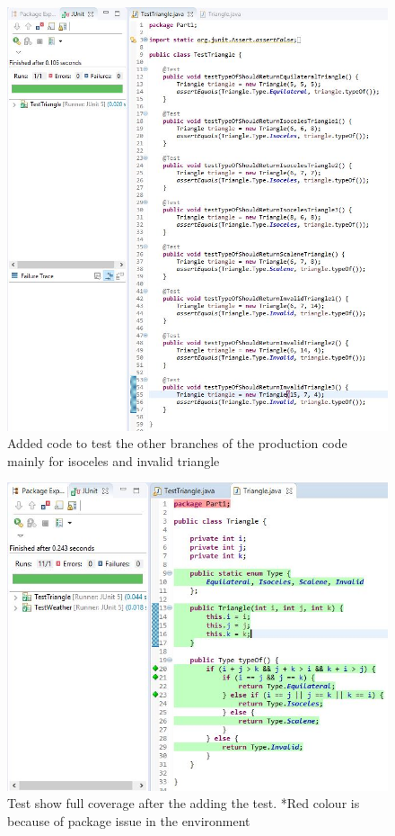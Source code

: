 \documentclass[9pt]{article}
\begin{document}
\begin{figure}[htb]
    \includegraphics[width=\linewidth]{./pics/p10.JPG}
    \caption{Added code to test the other branches of the production code mainly for isoceles and invalid triangle}
\end{figure}

\begin{figure}[htb]
    \includegraphics[width=\linewidth]{./pics/p11.JPG}
    \caption{Test show full coverage after the adding the test. *Red colour is because of package issue in the environment}
\end{figure}
\end{document}
